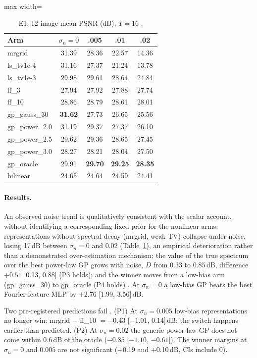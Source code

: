 \begin{table}[t]\centering\small
\caption{E1: 12-image mean PSNR (dB), $T=16$ .}\label{tab:e1}
\begin{adjustbox}{max width=\linewidth}\begin{tabular}{lcccc}\toprule
Arm & $\sigma_n{=}0$ & .005 & .01 & .02\\\midrule
mrgrid & 31.39 & 28.36 & 22.57 & 14.36\\
ls\_tv1e-4 & 31.16 & 27.37 & 21.24 & 13.78\\
ls\_tv1e-3 & 29.98 & 29.61 & 28.64 & 24.84\\
ff\_3 & 27.94 & 27.92 & 27.88 & 27.74\\
ff\_10 & 28.86 & 28.79 & 28.61 & 28.01\\
gp\_gauss\_30 & \textbf{31.62} & 27.73 & 26.65 & 25.56\\
gp\_power\_2.0 & 31.19 & 29.37 & 27.37 & 26.10\\
gp\_power\_2.5 & 29.62 & 29.36 & 28.65 & 27.45\\
gp\_power\_3.0 & 28.27 & 28.21 & 28.04 & 27.50\\
gp\_oracle & 29.91 & \textbf{29.70} & \textbf{29.25} & \textbf{28.35}\\
bilinear & 24.65 & 24.64 & 24.59 & 24.41\\
\bottomrule\end{tabular}\end{adjustbox}
\end{table}

\paragraph{Results.} An observed noise trend is qualitatively consistent with the scalar account, without identifying a corresponding fixed prior for the nonlinear arms: representations without spectral decay (mrgrid, weak TV) collapse
under noise, losing 17\,dB between $\sigma_n=0$ and $0.02$
(Table~\ref{tab:e1}), an empirical deterioration rather than a demonstrated over-estimation mechanism; the value of the true
spectrum over the best power-law GP grows with noise, $D$ from 0.33 to
0.85\,dB, difference $+0.51$ [0.13, 0.88] (P3 holds); and the winner moves
from a low-bias arm (gp\_gauss\_30) to gp\_oracle (P4 holds)
. At $\sigma_n=0$ a low-bias GP beats the best
Fourier-feature MLP by $+2.76$ [1.99, 3.56]\,dB.

Two pre-registered predictions fail . (P1) At
$\sigma_n=0.005$ low-bias representations no longer win: mrgrid $-$ ff\_10 $=
-0.43$ [$-1.01$, 0.14]\,dB; the switch happens earlier than predicted.
(P2) At $\sigma_n=0.02$ the generic power-law GP does not come within 0.6\,dB of
the oracle ($-0.85$ [$-1.10$, $-0.61$]). The winner margins at $\sigma_n=0$
and $0.005$ are not significant (+0.19 and +0.10\,dB, CIs include 0).

